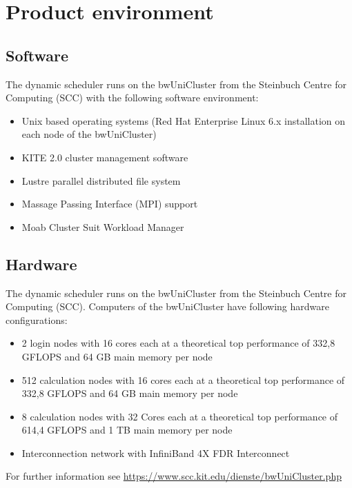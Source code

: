 \section{Product environment}
	\subsection{Software}
	The dynamic scheduler runs on the bwUniCluster from the Steinbuch Centre for Computing (SCC) with the following software environment:
	\begin{itemize}
		\item Unix based operating systems (Red Hat Enterprise Linux 6.x installation on each node of the bwUniCluster)
		\item KITE 2.0 cluster management software
		\item Lustre parallel distributed file system
		\item Massage Passing Interface (MPI) support
		\item Moab Cluster Suit Workload Manager
	\end{itemize}
	\subsection{Hardware}
	The dynamic scheduler runs on the bwUniCluster from the Steinbuch Centre for Computing (SCC). Computers of the bwUniCluster have following hardware configurations:
		\begin{itemize}
			\item 2 login nodes with 16 cores each at a theoretical top performance of 332,8 GFLOPS and 64 GB main memory per node 
			\item 512 calculation nodes with 16 cores each at a theoretical top performance of 332,8 GFLOPS and 64 GB main memory per node
			\item 8 calculation nodes with 32 Cores each at a theoretical top performance of 614,4 GFLOPS and 1 TB main memory per node
			\item Interconnection network with InfiniBand 4X FDR Interconnect
		\end{itemize}
		For further information see \href{https://www.scc.kit.edu/dienste/bwUniCluster.php}{https://www.scc.kit.edu/dienste/bwUniCluster.php}
    
 